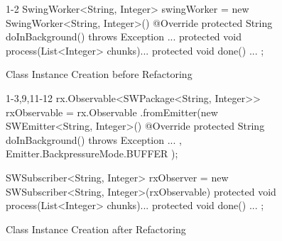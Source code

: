 \begin{figure}[H]
\begin{minipage}{0.48\textwidth}
\begin{sourcecode}
\begin{javacode}{1-2}
SwingWorker<String, Integer> swingWorker 
	= new SwingWorker<String, Integer>() {
	@Override
	protected String doInBackground() throws Exception {
		...
	}
	protected void process(List<Integer> chunks){...}
	protected void done() {...}
};
\end{javacode}
\caption{Class Instance Creation before Refactoring}
\label{code:cic-before}
\end{sourcecode}
\end{minipage}\hspace{0.7cm}
\begin{minipage}{0.48\textwidth}
\begin{sourcecode}
\begin{javacode}{1-3,9,11-12}
rx.Observable<SWPackage<String, Integer>> rxObservable 
	= rx.Observable
		.fromEmitter(new SWEmitter<String, Integer>() {
			@Override
			protected String doInBackground() 
			throws Exception {
				...
			}
}, Emitter.BackpressureMode.BUFFER );

SWSubscriber<String, Integer> rxObserver 
	= new SWSubscriber<String, Integer>(rxObservable) {
	protected void process(List<Integer> chunks){...}
	protected void done() {...}
};
\end{javacode}
\caption{Class Instance Creation after Refactoring}
\label{code:cic-after}
\end{sourcecode}
\end{minipage}
\end{figure}
